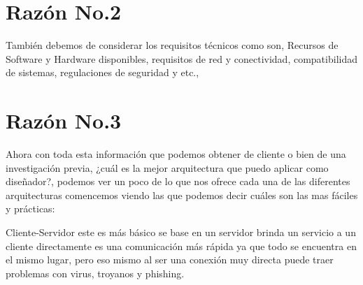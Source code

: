 \documentclass[11pt,letterpaper]{article}
\begin{document}

 

\section{Razón No.2}

También debemos de considerar los requisitos técnicos como son, Recursos de Software y Hardware disponibles, requisitos de red y conectividad, compatibilidad de sistemas, regulaciones de seguridad y etc., 




\begin{multicols}{2}

\end{multicols}


\section{Razón No.3}

Ahora con toda esta información que podemos obtener de cliente o bien de una investigación previa, ¿cuál es la mejor arquitectura que puedo aplicar como diseñador?, podemos ver un poco de lo que nos ofrece cada una de las diferentes arquitecturas comencemos viendo las que podemos decir cuáles son las mas fáciles y prácticas:

Cliente-Servidor este es más básico se base en un servidor brinda un servicio a un cliente directamente es una comunicación más rápida ya que todo se encuentra en el mismo lugar, pero eso mismo al ser una conexión muy directa puede traer problemas con virus, troyanos y phishing.
\end{document}
